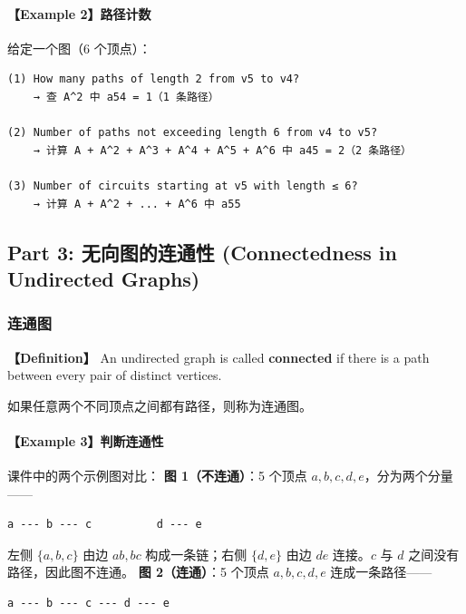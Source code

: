 \documentclass[10pt,a4paper,openany]{ctexbook}
\theoremstyle{definition}
\theoremstyle{remark}
\renewenvironment{quote}
  {\list{}{\leftmargin=1em\rightmargin=0pt\topsep=0.5pt\partopsep=0pt}\item[]}
  {\endlist}
\begin{document}
\paragraph{【Example 2】路径计数}

给定一个图（6 个顶点）：
{\footnotesize\begin{verbatim}
(1) How many paths of length 2 from v5 to v4?
    → 查 A^2 中 a54 = 1（1 条路径）

(2) Number of paths not exceeding length 6 from v4 to v5?
    → 计算 A + A^2 + A^3 + A^4 + A^5 + A^6 中 a45 = 2（2 条路径）

(3) Number of circuits starting at v5 with length ≤ 6?
    → 计算 A + A^2 + ... + A^6 中 a55
\end{verbatim}}

\vspace{-2pt}

\subsection{Part 3: 无向图的连通性 (Connectedness in Undirected Graphs)}

\subsubsection{连通图}

\textbf{【Definition】} An undirected graph is called \textbf{connected} if there is a path between every pair of distinct vertices.
\begin{quote}
如果任意两个不同顶点之间都有路径，则称为连通图。

\end{quote}

\paragraph{【Example 3】判断连通性}

课件中的两个示例图对比：
\textbf{图 1（不连通）}：5 个顶点 $a,b,c,d,e$，分为两个分量——
{\footnotesize\begin{verbatim}
a --- b --- c          d --- e
\end{verbatim}}

左侧 $\{a,b,c\}$ 由边 $ab,bc$ 构成一条链；右侧 $\{d,e\}$ 由边 $de$ 连接。$c$ 与 $d$ 之间没有路径，因此图不连通。
\textbf{图 2（连通）}：5 个顶点 $a,b,c,d,e$ 连成一条路径——
{\footnotesize\begin{verbatim}
a --- b --- c --- d --- e
\end{verbatim}}
\end{document}
